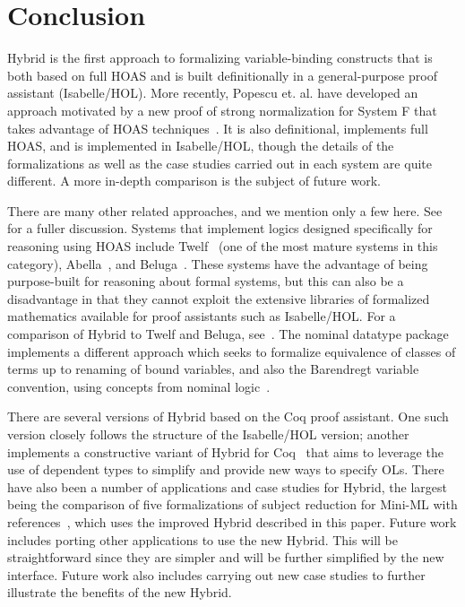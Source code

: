 \documentclass[copyright,creativecommons]{eptcs}
\begin{document}
\section{Conclusion}
\label{sec:conclude}

Hybrid is the first approach to formalizing variable-binding
constructs that is both based on full HOAS and is built definitionally
in a general-purpose proof assistant (Isabelle\slash HOL).  More
recently, Popescu et. al. have developed an approach motivated by a
new proof of strong normalization for System F that takes advantage of
HOAS techniques~\cite{popescu/gunter/osborn:2010}.  It is also
definitional, implements full HOAS, and is implemented in Isabelle/HOL,
though the details of the formalizations as well as the case studies
carried out in each system are quite different.  A more
in-depth comparison is the subject of future work.

There are many other related approaches, and we mention only a few
here. See~\cite{felty/momigliano:2008, martin:2010a} for a fuller
discussion.  Systems that implement logics designed specifically for
reasoning using HOAS include Twelf~\cite{pfenning/schurmann:1999} (one
of the most mature systems in this category),
Abella~\cite{gacek:2008}, and Beluga~\cite{pientka/dunfield:2010}.
These systems have the advantage of being purpose-built for reasoning
about formal systems, but this can also be a disadvantage in that they
cannot exploit the extensive libraries of formalized mathematics
available for proof assistants such as Isabelle\slash HOL.
For a comparison of Hybrid to Twelf and Beluga,
see~\cite{felty/pientka:ITP2011}.
The nominal datatype package~\cite{Urban:JAR2008} implements a
different approach which seeks to formalize equivalence of classes of
terms up to renaming of bound variables, and also the Barendregt
variable convention, using concepts from nominal
logic~\cite{GabbayPitts:FAC2002,Pitts:IandC2003}.

There are several versions of Hybrid based on the Coq proof assistant.
One such version \cite{felty/momigliano:2008} closely follows the
structure of the Isabelle\slash HOL version; another implements a
constructive variant of Hybrid for Coq~\cite{capretta/felty:2006} that
aims to leverage the use of dependent types to simplify and provide
new ways to specify OLs.  There have also been a number of
applications and case studies for Hybrid, the largest being the
comparison of five formalizations of subject reduction for Mini-ML
with references~\cite{martin:2010a}, which uses
the improved Hybrid described in this paper.  Future work includes
porting other applications to use the new Hybrid.  This will be
straightforward since they are simpler and will be further simplified
by the new interface.  Future work also includes carrying out new
case studies to further illustrate the benefits of the new Hybrid.
\end{document}
